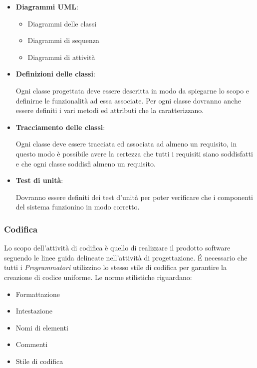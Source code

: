 \begin{itemize}
\item \textbf{Diagrammi UML}:
  \begin{itemize}
  \item Diagrammi delle classi
  \item Diagrammi di sequenza
  \item Diagrammi di attività
  \end{itemize}
\item \textbf{Definizioni delle classi}:

  Ogni classe progettata deve essere descritta in modo da spiegarne lo
  scopo e definirne le funzionalità ad essa associate. Per ogni classe
  dovranno anche essere definiti i vari metodi ed attributi che la
  caratterizzano. 

\item \textbf{Tracciamento delle classi}:

  Ogni classe deve essere tracciata ed associata ad almeno un
  requisito, in questo modo è possibile avere la certezza che tutti i
  requisiti siano soddisfatti e che ogni classe soddisfi almeno un
  requisito.  

\item \textbf{Test di unità}:

  Dovranno essere definiti dei test d’unità per poter verificare che i componenti
  del sistema funzionino in modo corretto.
\end{itemize}

\subsubsection{Codifica}

Lo scopo dell'attività di codifica è quello di realizzare il prodotto
software seguendo le linee guida delineate nell'attività di
progettazione. 
\'E necessario che tutti i  \emph{Programmatori}  utilizzino lo stesso stile di codifica
per garantire la creazione di codice uniforme. Le norme stilistiche riguardano:
\begin{itemize}
\item Formattazione
\item Intestazione
\item Nomi di elementi
\item Commenti
\item Stile di codifica
\end{itemize}
